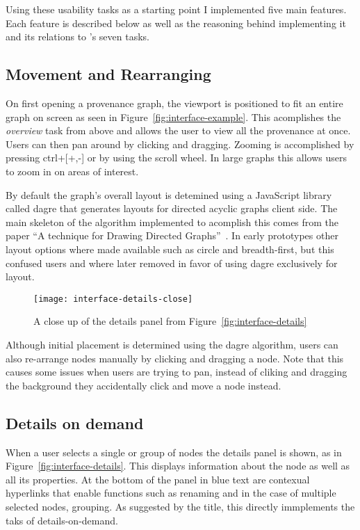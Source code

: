 Using these usability tasks as a starting point I implemented five main features. Each feature is described below as well as the reasoning behind implementing it and its relations to \citeauthor{Shneiderman1996}'s seven tasks.

\subsection{Movement and Rearranging}
\label{sec:movement_and_rearranging}

On first opening a provenance graph, the viewport is positioned to fit an entire graph on screen as seen in Figure~\ref{fig:interface-example}. This acomplishes the \textit{overview} task from above and allows the user to view all the provenance at once. Users can then pan around by clicking and dragging. Zooming is accomplished by pressing ctrl+[+,-] or by using the scroll wheel. In large graphs this allows users to zoom in on areas of interest. 

By default the graph's overall layout is detemined using a JavaScript library called dagre that generates layouts for directed acyclic graphs client side. The main skeleton of the algorithm implemented to acomplish this comes from the paper ``A technique for Drawing Directed Graphs''~\cite{Gansner1993}. In early prototypes other layout options where made available such as circle and breadth-first, but this confused users and where later removed in favor of using dagre exclusively for layout.

\begin{figure}[h]
	\centering
	\texttt{[image: interface-details-close]}
	\caption{A close up of the details panel from Figure~\ref{fig:interface-details}}
	\label{fig:key-concepts}
\end{figure}

Although initial placement is determined using the dagre algorithm, users can also re-arrange nodes manually by clicking and dragging a node. Note that this causes some issues when users are trying to pan, instead of cliking and dragging the background they accidentally click and move a node instead.

\subsection{Details on demand}
\label{sec:details_on_demand}

When a user selects a single or group of nodes the details panel is shown, as in Figure~\ref{fig:interface-details}. This displays information about the node as well as all its properties. At the bottom of the panel in blue text are contexual hyperlinks that enable functions such as renaming and in the case of multiple selected nodes, grouping. As suggested by the title, this directly immplements the taks of details-on-demand.

